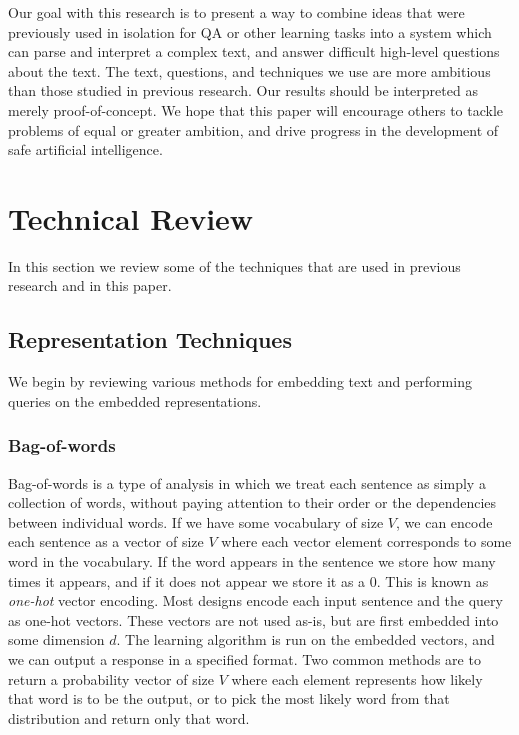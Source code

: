 \documentclass[pageno]{final_paper}
\begin{document}
Our goal with this research is to present a way to combine ideas that were
previously used in isolation for QA or other learning tasks into a system which
can parse and interpret a complex text, and answer difficult high-level
questions about the text. The text, questions, and techniques we use are more
ambitious than those studied in previous research. Our results should be
interpreted as merely proof-of-concept. We hope that this paper will encourage
others to tackle problems of equal or greater ambition, and drive progress in
the development of safe artificial intelligence.

\section{Technical Review}
\label{Technical Review}

In this section we review some of the techniques that are used in previous
research and in this paper.

\subsection{Representation Techniques}
\label{Representation Techniques}

We begin by reviewing various methods for embedding text and performing queries
on the embedded representations. \\

\subsubsection{Bag-of-words}
\label{Bag-of-words}

Bag-of-words is a type of analysis in which we treat each sentence as simply a
collection of words, without paying attention to their order or the dependencies
between individual words. If we have some vocabulary of size $V$, we can encode
each sentence as a vector of size $V$ where each vector element corresponds to
some word in the vocabulary. If the word appears in the sentence we store how
many times it appears, and if it does not appear we store it as a 0. This is
known as \textit{one-hot} vector encoding. Most designs encode each input
sentence and the query as one-hot vectors. These vectors are not used as-is, but
are first embedded into some dimension $d$. The learning algorithm is run on the
embedded vectors, and we can output a response in a specified format. Two common
methods are to return a probability vector of size $V$ where each element
represents how likely that word is to be the output, or to pick the most likely
word from that distribution and return only that word. \\
\end{document}
